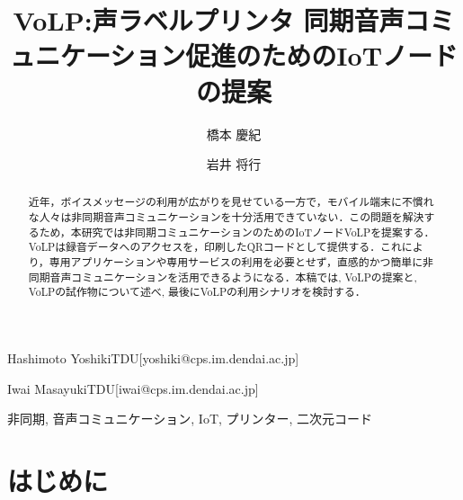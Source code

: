 \documentclass[submit,techrep,noauthor]{ipsj}
\begin{document}
\title{VoLP:声ラベルプリンタ 同期音声コミュニケーション促進のためのIoTノードの提案}

\author{橋本 慶紀}{Hashimoto Yoshiki}{TDU}[yoshiki@cps.im.dendai.ac.jp]
\author{岩井 将行}{Iwai Masayuki}{TDU}[iwai@cps.im.dendai.ac.jp]

\begin{abstract}
近年，ボイスメッセージの利用が広がりを見せている一方で，モバイル端末に不慣れな人々は非同期音声コミュニケーションを十分活用できていない．この問題を解決するため，本研究では非同期コミュニケーションのためのIoTノードVoLPを提案する．VoLPは録音データへのアクセスを，印刷したQRコードとして提供する．これにより，専用アプリケーションや専用サービスの利用を必要とせず，直感的かつ簡単に非同期音声コミュニケーションを活用できるようになる．本稿では, VoLPの提案と, VoLPの試作物について述べ, 最後にVoLPの利用シナリオを検討する．

\end{abstract}

\begin{jkeyword}
非同期, 音声コミュニケーション, IoT, プリンター, 二次元コード
\end{jkeyword}

\maketitle

\section{はじめに}
\end{document}
